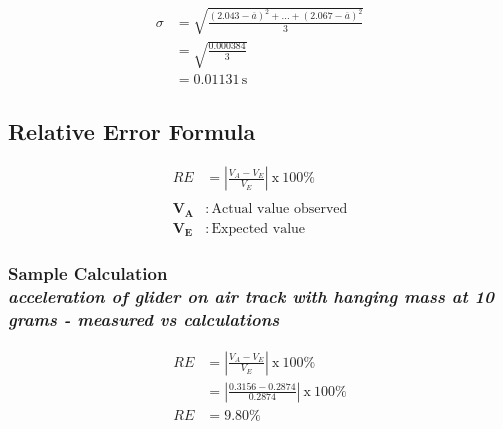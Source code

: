 \begin{align*}
	\sigma &= \sqrt{\frac{(2.043-\overline{a})^2 + ... + (2.067-\overline{a})^2}{3}} \\
		 &= \sqrt{\frac{0.000384}{3}} \\
		 &= \boxed{0.01131\, \text{s}}
\end{align*}

\subsection{Relative Error Formula}

\begin{align*}
	RE &= \left| {\frac{V_A-V_E}{V_E}} \right|\: \text{x}\: 100\% \\ \\
	\boldsymbol{V_A} &:\, \text{Actual value observed} \\
	\boldsymbol{V_E} &:\, \text{Expected value} 
\end{align*}

\subsubsection{Sample Calculation \\ {\normalfont \small\textit{acceleration of glider on air track with hanging mass at 10 grams - measured vs calculations}}}

\begin{align*}
	RE &= \left| {\frac{V_A-V_E}{V_E}} \right|\: \text{x}\: 100\% \\
	 &= \left| {\frac{0.3156-0.2874}{0.2874}} \right|\: \text{x}\: 100\% \\
			RE &= \boxed{9.80\%} 
\end{align*}


